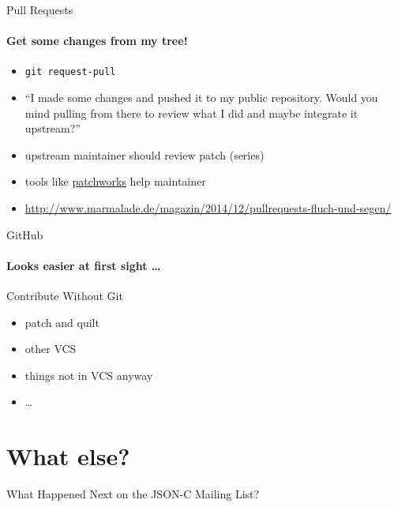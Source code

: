 \documentclass{beamer}
\begin{document}
\begin{frame}{Pull Requests}
    \framesubtitle{Get some changes from my tree!}
    \begin{itemize}
        \item \texttt{git request-pull}
        \pause
        \item \enquote{I made some changes and pushed it to my public
                repository. Would you mind pulling from there to review
                what I did and maybe integrate it upstream?}
        \pause
        \item upstream maintainer should review patch (series)
        \item tools like \href{https://patchwork.ozlabs.org/}{patchworks}
                help maintainer
        \item \url{http://www.marmalade.de/magazin/2014/12/pullrequests-fluch-und-segen/}
    \end{itemize}
\end{frame}

\begin{frame}{GitHub}
    \framesubtitle{Looks easier at first sight \dots}
\end{frame}

\begin{frame}{Contribute Without Git}
    \begin{itemize}
        \item patch and quilt
        \item other VCS
        \item things not in VCS anyway
        \item \dots
    \end{itemize}
\end{frame}

\section*{What else?}

\begin{frame}{What Happened Next on the JSON-C Mailing List?}
\end{frame}
\end{document}
